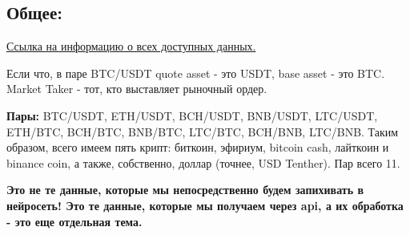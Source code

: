 \documentclass[a4paper,12pt]{article}
\begin{document}
\subsection*{Общее:}
	
\href{https://github.com/binance-exchange/binance-official-api-docs/blob/master/web-socket-streams.md}{Ссылка на информацию о всех доступных данных.}

Если что, в паре BTC/USDT quote asset - это USDT, base asset - это BTC. Market Taker - тот, кто выставляет рыночный ордер.

\textbf{Пары:} BTC/USDT, ETH/USDT, BCH/USDT, BNB/USDT, LTC/USDT, ETH/BTC, BCH/BTC, BNB/BTC, LTC/BTC, BCH/BNB, LTC/BNB. Таким образом, всего имеем пять крипт: биткоин, эфириум, bitcoin cash, лайткоин и binance coin, а также, собственно, доллар (точнее, USD Tenther). Пар всего 11.

\textbf{Это не те данные, которые мы непосредственно будем запихивать в нейросеть! Это те данные, которые мы получаем через api, а их обработка - это еще отдельная тема.}
\end{document}
